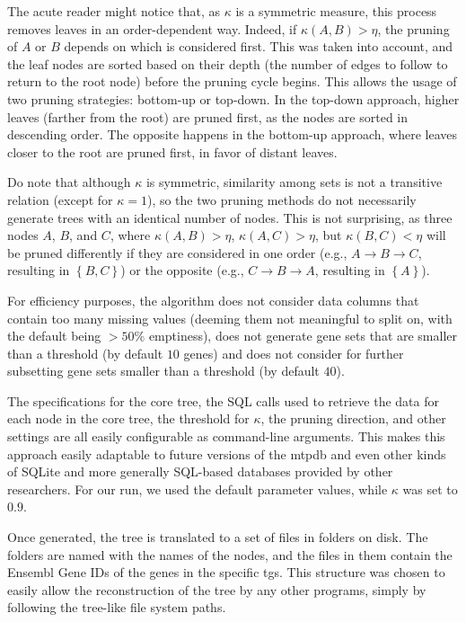 The acute reader might notice that, as $\kappa$ is a symmetric measure, this process removes leaves in an order-dependent way.
Indeed, if $\kappa\left(A,B\right) > \eta$, the pruning of $A$ or $B$ depends on which is considered first.
This was taken into account, and the leaf nodes are sorted based on their depth (the number of edges to follow to return to the root node) before the pruning cycle begins.
This allows the usage of two pruning strategies: bottom-up or top-down.
In the top-down approach, higher leaves (farther from the root) are pruned first, as the nodes are sorted in descending order.
The opposite happens in the bottom-up approach, where leaves closer to the root are pruned first, in favor of distant leaves.

Do note that although $\kappa$ is symmetric, similarity among sets is not a transitive relation (except for $\kappa = 1$), so the two pruning methods do not necessarily generate trees with an identical number of nodes.
This is not surprising, as three nodes $A$, $B$, and $C$, where $\kappa(A,B) > \eta$, $\kappa(A,C) > \eta$, but $\kappa(B,C) < \eta$ will be pruned differently if they are considered in one order (e.g., $A \rightarrow B \rightarrow C$, resulting in $\left\{B,C\right\}$) or the opposite (e.g., $C \rightarrow B \rightarrow A$, resulting in $\left\{A\right\}$).

For efficiency purposes, the algorithm does not consider data columns that contain too many missing values (deeming them not meaningful to split on, with the default being $> 50\%$ emptiness), does not generate gene sets that are smaller than a threshold (by default $10$ genes) and does not consider for further subsetting gene sets smaller than a threshold (by default $40$).

The specifications for the core tree, the SQL calls used to retrieve the data for each node in the core tree, the threshold for $\kappa$, the pruning direction, and other settings are all easily configurable as command-line arguments.
This makes this approach easily adaptable to future versions of the \gls{mtpdb} and even other kinds of SQLite and more generally SQL-based databases provided by other researchers.
For our run, we used the default parameter values, while $\kappa$ was set to $0.9$.

Once generated, the tree is translated to a set of files in folders on disk.
The folders are named with the names of the nodes, and the  files in them contain the Ensembl Gene IDs of the genes in the specific \gls{tgs}.
This structure was chosen to easily allow the reconstruction of the tree by any other programs, simply by following the tree-like file system paths.

